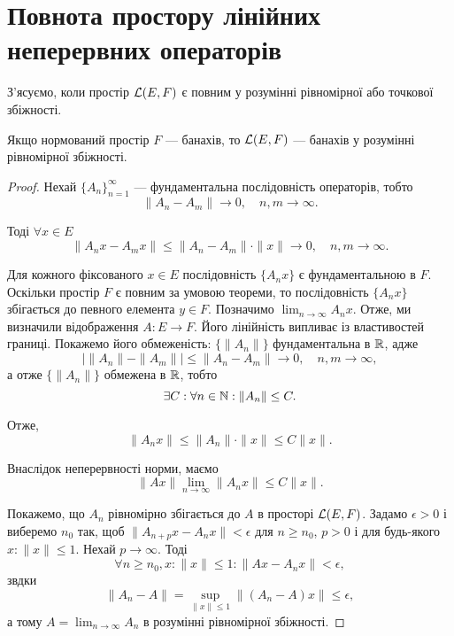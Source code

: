 \section{Повнота простору лінійних неперервних операторів}

З’ясуємо, коли простір $\mathcal{L}(E, F)$ є повним у розумінні
рівномірної або точкової збіжності.

\begin{theorem}
Якщо нормований простір $F$ --- банахів,
то $\mathcal{L}(E, F)$ --- банахів у розумінні рівномірної збіжності.
\end{theorem}

\begin{proof}
Нехай $\{A_n\}_{n = 1}^\infty$ --- фундаментальна
послідовність операторів, тобто
\begin{equation*}
    \|A_n - A_m\| \to 0, \quad n, m \to \infty.
\end{equation*}

Тоді $\forall x \in E$
\begin{equation*}
    \|A_n x - A_m x\| \le \|A_n - A_m\| \cdot \|x\| \to 0, \quad n, m \to \infty.
\end{equation*}

Для кожного фіксованого $x \in E$ послідовність $\{A_n x\}$ є
фундаментальною в $F$. Оскільки простір $F$ є повним за
умовою теореми, то послідовність $\{A_n x\}$ збігається до
певного елемента $y \in F$. Позначимо $\lim_{n \to \infty} A_n x$.
Отже, ми визначили відображення $A: E \to F$.
Його лінійність випливає із властивостей границі.
Покажемо його обмеженість:
$\{\|A_n\|\}$ фундаментальна в $\mathbb{R}$, адже
\begin{equation*}
    |\|A_n\| - \|A_m\|| \le \|A_n - A_m\| \to 0, \quad n, m \to \infty,
\end{equation*}
а отже $\{\|A_n\|\}$ обмежена в $\mathbb{R}$, тобто
\begin{equation*}
    \exists C: \forall n \in \mathbb{N}: \|A_n\| \le C.
\end{equation*}

Отже,
\begin{equation*}
    \|A_n x\| \le \|A_n\| \cdot \|x\| \le C \|x\|.
\end{equation*}

Внаслідок неперервності норми, маємо
\begin{equation*}
    \|A x\| \lim_{n \to \infty} \|A_n x\| \le C \|x\|.
\end{equation*}

Покажемо, що $A_n$ рівномірно збігається до $A$ в просторі
$\mathcal{L}(E, F)$. Задамо $\epsilon > 0$ і виберемо $n_0$ так, щоб
$\|A_{n + p} x - A_n x\| < \epsilon$ для $n \ge n_0$, $p > 0$ і для будь-якого
$x: \|x\| \le 1$.
Нехай $p \to \infty$. Тоді
\begin{equation*}
    \forall n \ge n_0, x: \|x\| \le 1:
    \|A x - A_n x\| < \epsilon,
\end{equation*}
звдки
\begin{equation*}
    \|A_n - A\| = \sup_{\|x\| \le 1} \|(A_n - A) x\| \le \epsilon,
\end{equation*}
а тому $A = \lim_{n \to \infty} A_n$
в розумінні рівномірної збіжності.


\end{proof}
